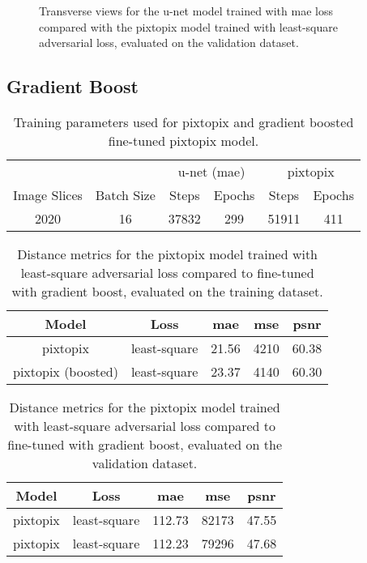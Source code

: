 \begin{figure}[h]
  \centering
  \begin{adjustbox}{width=\linewidth}
  \end{adjustbox}
  \caption{Transverse views for the u-net model trained with \acrshort{mae}
    loss compared with the pixtopix model trained with least-square adversarial
    loss, evaluated on the validation dataset.
  }\label{fig:unet_pixtopix:validation}
\end{figure}

\subsection{Gradient Boost}

\begin{table}[h]
  \centering
  \begin{tabular}{cccccc}
    \toprule
    & &
    \multicolumn{2}{c}{u-net (\gls{mae})} &
    \multicolumn{2}{c}{pixtopix} \\
    Image Slices & Batch Size & Steps & Epochs & Steps & Epochs \\
    \midrule
    \num{2020} & \num{16} & \num{37832} & \num{299} & \num{51911} & \num{411} \\
    \bottomrule
  \end{tabular}
  \caption{Training parameters used for pixtopix and gradient boosted
    fine-tuned pixtopix model.
  }\label{tab:pixtopix:params}
\end{table}
\begin{table}[h]
  \centering
  \begin{tabular}{ccccc}
    \toprule
    Model & Loss &
    \acrshort{mae} &
    \acrshort{mse} &
    \acrshort{psnr} \\
    \midrule
    pixtopix & least-square & \num{21.56} & \num{4210} & \num{60.38} \\
    pixtopix (boosted) & least-square & \num{23.37} & \num{4140} & \num{60.30} \\
    \bottomrule
  \end{tabular}
  \caption{Distance metrics for the pixtopix model trained with least-square
    adversarial loss compared to fine-tuned with gradient boost, evaluated on
    the training dataset.
  }\label{tab:pixtopix:training}
\end{table}
\begin{table}[h]
  \centering
  \begin{tabular}{ccccc}
    \toprule
    Model & Loss &
    \acrshort{mae} &
    \acrshort{mse} &
    \acrshort{psnr} \\
    \midrule
    pixtopix & least-square & \num{112.73} & \num{82173} & \num{47.55} \\
    pixtopix & least-square & \num{112.23} & \num{79296} & \num{47.68} \\
    \bottomrule
  \end{tabular}
  \caption{Distance metrics for the pixtopix model trained with least-square
    adversarial loss compared to fine-tuned with gradient boost, evaluated on
    the validation dataset.
  }\label{tab:pixtopix:validation}
\end{table}
